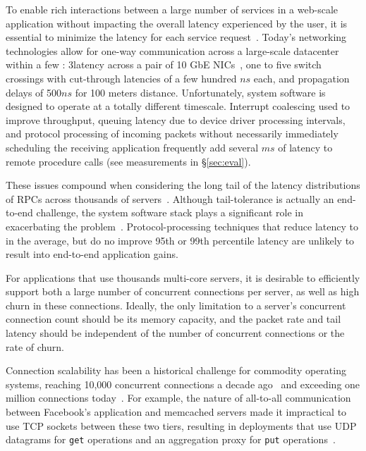 To enable rich interactions between a
large number of services in a web-scale application without impacting
the overall latency experienced by the user, it is essential to
minimize the latency for each service
request~\cite{luiz-isscc,rumble2011s}. Today's networking
technologies allow for one-way communication across a large-scale
datacenter within a few \microsecond: 3\microsecond latency across
a pair of 10 GbE NICs~\cite{cisco-sereno}, one to five switch
crossings with cut-through latencies of a few hundred $ns$ each, and
propagation delays of 500$ns$ for 100 meters distance. Unfortunately,
system software is designed to operate at a totally different
timescale. Interrupt coalescing used to improve throughput, queuing
latency due to device driver processing intervals, and protocol
processing of incoming packets without necessarily immediately
scheduling the receiving application frequently add several $ms$ of
latency to remote procedure calls (see measurements in \S\ref{sec:eval}).


These issues compound when considering the long tail of the latency
distributions of RPCs across thousands of
servers~\cite{DBLP:journals/cacm/DeanB13}. Although tail-tolerance is
actually an end-to-end challenge, the system software stack plays a
significant role in exacerbating the problem~\cite{Leverich:RHSU:2014}.
Protocol-processing techniques that reduce latency to \microsecond in
the average, but do no improve 95th or 99th percentile latency are
unlikely to result into end-to-end application gains.

 For applications that use thousands
multi-core servers, it is desirable to efficiently support both a
large number of concurrent connections per server, as well as high
churn in these connections.  Ideally, the only limitation to a
server's concurrent connection count should be its memory capacity, and
the packet rate and tail latency should be independent of the number
of concurrent connections or the rate of churn.
 
Connection scalability has been a historical challenge for commodity
operating systems, reaching 10,000 concurrent connections a decade
ago~\cite{theC10Kproblem} and exceeding one million connections
today~\cite{theC10Mproblem}. For example, the nature of all-to-all
communication between Facebook's application and memcached servers
made it impractical to use TCP sockets between these two tiers,
resulting in deployments that use UDP datagrams for \texttt{get}
operations and an aggregation proxy for \texttt{put}
operations~\cite{nishtala2013scaling}.

